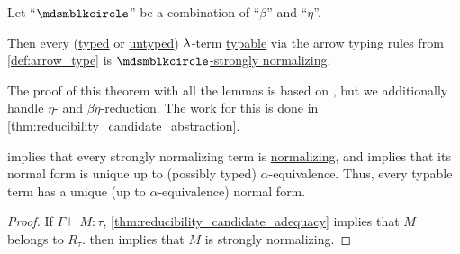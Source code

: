 \begin{theorem}\label{thm:simply_typable_terms_are_strongly_normalizing}
  Let \enquote{\( {\Anon} \)} be a combination of \enquote{\( \beta \)} and \enquote{\( \eta \)}.

  Then every (\hyperref[def:typed_lambda_term]{typed} or \hyperref[def:lambda_term]{untyped}) \( {\mathrm \lambda} \)-term \hyperref[def:typability]{typable} via the arrow typing rules from \cref{def:arrow_type} is \hyperref[def:strongly_normalizing_lambda_term]{\( \Anon \)-strongly normalizing}.
\end{theorem}
\begin{comments}
  \item The proof of this theorem with all the lemmas is based on , but we additionally handle \( \eta \)- and \( \beta\eta \)-reduction. The work for this is done in \cref{thm:reducibility_candidate_abstraction}.

  \item {} implies that every strongly normalizing term is \hyperref[def:lambda_term_normal_form]{normalizing}, and  implies that its normal form is unique up to (possibly typed) \( \alpha \)-equivalence. Thus, every typable term has a unique (up to \( \alpha \)-equivalence) normal form.
\end{comments}
\begin{proof}
  If \( \Gamma \vdash M: \tau \), \cref{thm:reducibility_candidate_adequacy} implies that \( M \) belongs to \( R_\tau \).  then implies that \( M \) is strongly normalizing.
\end{proof}

